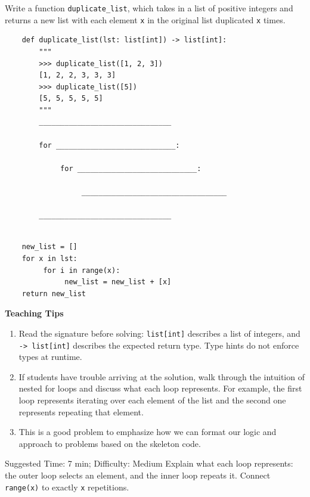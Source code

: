 \begin{blocksection}
    \question Write a function \lstinline{duplicate_list}, which takes in a list of positive integers and returns a new list with each element \lstinline{x} in the original list duplicated \lstinline{x} times.
    
    \begin{lstlisting}
    def duplicate_list(lst: list[int]) -> list[int]:
        """
        >>> duplicate_list([1, 2, 3])
        [1, 2, 2, 3, 3, 3]
        >>> duplicate_list([5])
        [5, 5, 5, 5, 5]
        """
        _______________________________
        
        for ____________________________:
    
             for ____________________________:
    
                  __________________________________
    
        _______________________________
    
    \end{lstlisting}
    
    \begin{solution}
    \begin{lstlisting}
    new_list = []
    for x in lst:
         for i in range(x):
              new_list = new_list + [x]
    return new_list
    \end{lstlisting}
    \end{solution}
    \end{blocksection}
    
    \begin{meta}
    \textbf{Teaching Tips}
        \begin{enumerate}
                \item Read the signature before solving: \lstinline{list[int]} describes a list of integers, and \lstinline{-> list[int]} describes the expected return type. Type hints do not enforce types at runtime.
                \item If students have trouble arriving at the solution, walk through the intuition of nested for loops
                and discuss what each loop represents. For example, the first loop represents iterating over each element
                of the list and the second one represents repeating that element.
                \item This is a good problem to emphasize how we can format our logic and approach to problems based on 
                the skeleton code.
        \end{enumerate}
    \end{meta}

\begin{questionmeta}
    Suggested Time: 7 min; Difficulty: Medium
    Explain what each loop represents: the outer loop selects an element, and the inner loop repeats it. Connect \lstinline{range(x)} to exactly \lstinline{x} repetitions.
\end{questionmeta}
